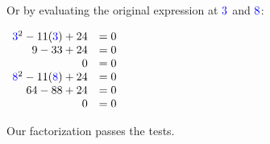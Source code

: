\documentclass{ximera}
\begin{document}
 Or by evaluating the original expression at ${\color{blue}{{3}}}$ and ${\color{blue}{{8}}}$:
\begin{center}
$\begin{array}{rl}
    {\color{blue}{{3}}}^2-11({\color{blue}{{3}}})+24 & = 0 \\
            9-33+24 & = 0 \\
            0 & = 0 \\
{\color{blue}{{8}}}^2-11({\color{blue}{{8}}})+24 &=0\\
64-88+24 & =0\\
 0 & =0
\end{array}$
\end{center}
Our factorization passes the tests.






\end{document}
